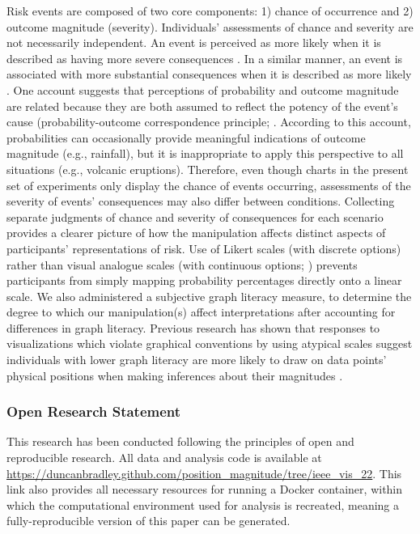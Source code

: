 \documentclass[journal]{vgtc}                %
\begin{document}
Risk events are composed of two core components: 1) chance of occurrence
and 2) outcome magnitude (severity). Individuals' assessments of chance
and severity are not necessarily independent. An event is perceived as
more likely when it is described as having more severe consequences
\citep{harris_estimating_2009, harris_communicating_2011}. In a similar
manner, an event is associated with more substantial consequences when
it is described as more likely \citep{kupor_probable_2020}. One account
suggests that perceptions of probability and outcome magnitude are
related because they are both assumed to reflect the potency of the
event's cause (probability-outcome correspondence principle; \citep{keren_probabilityoutcome_2001}. According to this account,
probabilities can occasionally provide meaningful indications of outcome
magnitude (e.g., rainfall), but it is inappropriate to apply this
perspective to all situations (e.g., volcanic eruptions). Therefore,
even though charts in the present set of experiments only display the
chance of events occurring, assessments of the severity of events'
consequences may also differ between conditions. Collecting separate
judgments of chance and severity of consequences for each scenario
provides a clearer picture of how the manipulation affects distinct
aspects of participants' representations of risk. Use of Likert scales
(with discrete options) rather than visual analogue scales (with
continuous options; \citep{sung_visual_2018}) prevents participants from
simply mapping probability percentages directly onto a linear scale. We
also administered a subjective graph literacy measure, to determine
the degree to which our manipulation(s) affect interpretations after
accounting for differences in graph literacy. Previous
research has shown that responses to visualizations which violate
graphical conventions by using atypical scales suggest individuals with
lower graph literacy are more likely to draw on data
points' physical positions when making inferences about their magnitudes
\citep{okan_how_2016, okan_when_2012}.

\hypertarget{open-research-statement}{%
\subsubsection{Open Research Statement}\label{open-research-statement}}

This research has been conducted following the principles of open and reproducible research. All data and analysis code is available at \url{https://duncanbradley.github.com/position_magnitude/tree/ieee_vis_22}. This link also provides all necessary resources for running a Docker container, within which the computational environment used for analysis is recreated, meaning a fully-reproducible version of this paper can be generated.
\end{document}
